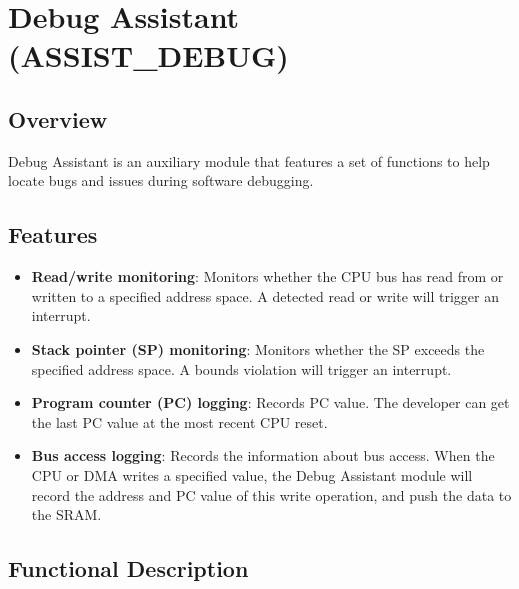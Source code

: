 \documentclass[main\_\_EN.tex]{subfiles}
\begin{document}

\ifglobal
\else
    {\let\clearpage\relax \listoftodos}
  
    \tableofcontents
\fi



\chapter{Debug Assistant (ASSIST\_DEBUG)}
\label{mod:dbgassist}
\hypertarget{dbgassist}{}

\section{Overview}

Debug Assistant is an auxiliary module that features a set of functions to help locate bugs and issues during software debugging.

\section{Features}
\label{sec:dbgassist-features}

\begin{itemize}
    \item 
    {\bfseries Read/write monitoring}: Monitors whether the CPU bus has read from or written to a specified address space. A detected read or write will trigger an interrupt.
    \item 
    {\bfseries Stack pointer (SP) monitoring}: Monitors whether the SP exceeds the specified address space. A bounds violation will trigger an interrupt.
    \item 
    {\bfseries Program counter (PC) logging}: Records PC value. The developer can get the last PC value at the most recent CPU reset.
    \item
    {\bfseries Bus access logging}: Records the information about bus access. When the CPU or DMA writes a specified value, the Debug Assistant module will record the address and PC value of this write operation, and push the data to the SRAM.
\end{itemize}

\section{Functional Description}
\label{sec:dbgassist-func-descr}
\end{document}

